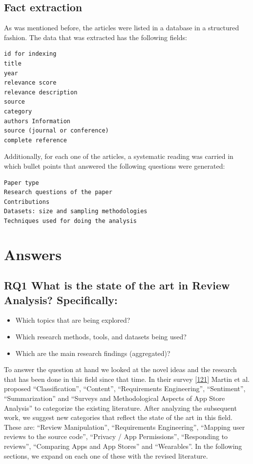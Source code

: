 \documentclass[]{book}
\providecommand{\tightlist}{%
  \setlength{\itemsep}{0pt}\setlength{\parskip}{0pt}}
\begin{document}
\subsection{Fact extraction}\label{fact-extraction}

As was mentioned before, the articles were listed in a database in a
structured fashion. The data that was extracted has the following
fields:

\begin{verbatim}
id for indexing
title
year 
relevance score 
relevance description 
source 
category
authors Information
source (journal or conference)
complete reference
\end{verbatim}

Additionally, for each one of the articles, a systematic reading was
carried in which bullet points that answered the following questions
were generated:

\begin{verbatim}
Paper type
Research questions of the paper
Contributions
Datasets: size and sampling methodologies
Techniques used for doing the analysis 
\end{verbatim}

\section{Answers}\label{answers-5}

\subsection{\texorpdfstring{\textbf{RQ1} What is the state of the art in
Review Analysis?
Specifically:}{RQ1 What is the state of the art in Review Analysis? Specifically:}}\label{rq1-what-is-the-state-of-the-art-in-review-analysis-specifically}

\begin{itemize}
\tightlist
\item
  Which topics that are being explored?
\item
  Which research methods, tools, and datasets being used?
\item
  Which are the main research findings (aggregated)?
\end{itemize}

To answer the question at hand we looked at the novel ideas and the
research that has been done in this field since that time. In their
survey {[}\protect\hyperlink{ref-martin2015survey}{121}{]} Martin et al.
proposed ``Classification'', ``Content'', ``Requirements Engineering'',
``Sentiment'', ``Summarization'' and ``Surveys and Methodological
Aspects of App Store Analysis'' to categorize the existing literature.
After analyzing the subsequent work, we suggest new categories that
reflect the state of the art in this field. These are: ``Review
Manipulation'', ``Requirements Engineering'', ``Mapping user reviews to
the source code'', ``Privacy / App Permissions'', ``Responding to
reviews'', ``Comparing Apps and App Stores'' and ``Wearables''. In the
following sections, we expand on each one of these with the revised
literature.
\end{document}

